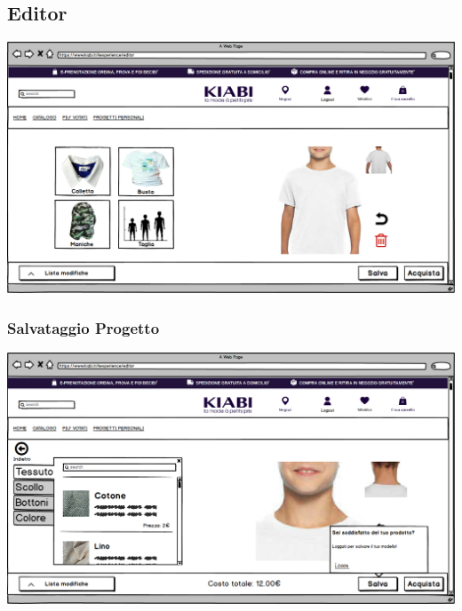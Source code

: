 \documentclass[12pt,italian,]{report}
\begin{document}
\subsection{Editor} 
\includegraphics{balsamiq/Editor base.png}
\subsubsection{Salvataggio Progetto} 
\includegraphics{balsamiq/Editor - caratteristica collo tessuto non loggato.png}
\end{document}
